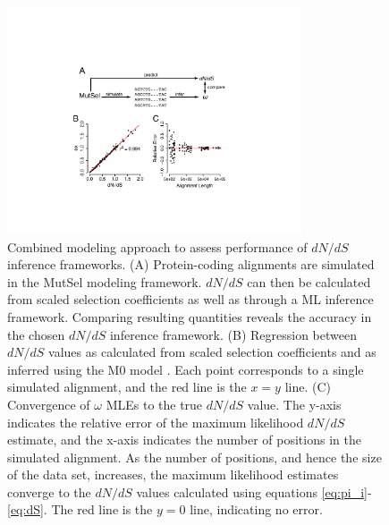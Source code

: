 \documentclass[11pt]{article}
\begin{document}
\begin{figure}[htbp]
	\centerline{\includegraphics[width=8.7cm]{figures/MainText/regression_convergence.pdf}}
	\caption{\label{reg_conv} Combined modeling approach to assess performance of $dN/dS$ inference frameworks. (A) Protein-coding alignments are simulated in the MutSel modeling framework. $dN/dS$ can then be calculated from scaled selection coefficients as well as through a ML inference framework. Comparing resulting quantities reveals the accuracy in the chosen $dN/dS$ inference framework. (B) Regression between $dN/dS$ values as calculated from scaled selection coefficients and as inferred using the M0 model \cite{GoldmanYang1994,NielsenYang1998,Yangetal2000}. Each point corresponds to a single simulated alignment, and the red line is the $x=y$ line. (C) Convergence of $\omega$ MLEs to the true $dN/dS$ value. The y-axis indicates the relative error of the maximum likelihood $dN/dS$ estimate, and the x-axis indicates the number of positions in the simulated alignment. As the number of positions, and hence the size of the data set, increases, the maximum likelihood estimates converge to the $dN/dS$ values calculated using equations \eqref{eq:pi_i}-\eqref{eq:dS}. The red line is the $y=0$ line, indicating no error.}
\end{figure}
	
\vspace{2cm}
	
\end{document}
